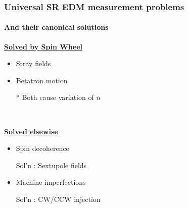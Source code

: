 \documentclass{beamer}
\newcommand{\nbar}{\bar n}
\begin{document}
\begin{frame}\frametitle{Universal SR EDM measurement problems}\framesubtitle{And their canonical solutions}
    \begin{minipage}[t]{.5\linewidth}
    \underline{\textbf{Solved by Spin Wheel}}
    \begin{itemize}
    \item Stray fields
    \item Betatron motion
      \item[*] Both cause variation of $\nbar$
    \end{itemize}
  \end{minipage}~%
  \begin{minipage}[t]{.5\linewidth}
    \underline{\textbf{Solved elsewise}}
    \begin{itemize}
    \item Spin decoherence
    \item[Sol'n]: Sextupole fields
    \item Machine imperfections 
    \item[Sol'n]: CW/CCW injection
    \end{itemize}
  \end{minipage}
\end{frame}
\end{document}
